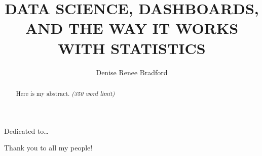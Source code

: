 \documentclass[print]{nuthesis}
\begin{document}
\frontmatter
\title{DATA SCIENCE, DASHBOARDS, AND THE WAY IT WORKS WITH STATISTICS}
\author{Denise Renee Bradford}
\maketitle


\begin{abstract}
    Here is my abstract. \emph{(350 word limit)}
\end{abstract}

\begin{copyrightpage}
\end{copyrightpage}

\begin{dedication}
Dedicated to\ldots{}
\end{dedication}

\begin{acknowledgments}
Thank you to all my people!
\end{acknowledgments}


\tableofcontents

\listoffigures
\listoftables

\mainmatter
\end{document}
